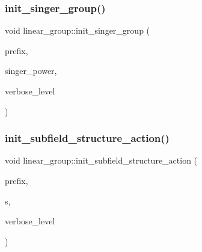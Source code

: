 \mbox{\label{classlinear__group_a6725d2f004cc13eadaa39dc29b26faae}} 
\subsubsection{\texorpdfstring{init\+\_\+singer\+\_\+group()}{init\_singer\_group()}}
{\footnotesize\ttfamily void linear\+\_\+group\+::init\+\_\+singer\+\_\+group (\begin{DoxyParamCaption}\item[{\mbox{\hyperlink{galois_8h_ab6cc7b4aeb6ea31aba2b3fbfc83ff5e6}{B\+Y\+TE}} $\ast$}]{prefix,  }\item[{\mbox{\hyperlink{galois_8h_a09fddde158a3a20bd2dcadb609de11dc}{I\+NT}}}]{singer\+\_\+power,  }\item[{\mbox{\hyperlink{galois_8h_a09fddde158a3a20bd2dcadb609de11dc}{I\+NT}}}]{verbose\+\_\+level }\end{DoxyParamCaption})}

\mbox{\label{classlinear__group_a0c97a4ac9754a69abdde052bd3298804}} 
\subsubsection{\texorpdfstring{init\+\_\+subfield\+\_\+structure\+\_\+action()}{init\_subfield\_structure\_action()}}
{\footnotesize\ttfamily void linear\+\_\+group\+::init\+\_\+subfield\+\_\+structure\+\_\+action (\begin{DoxyParamCaption}\item[{\mbox{\hyperlink{galois_8h_ab6cc7b4aeb6ea31aba2b3fbfc83ff5e6}{B\+Y\+TE}} $\ast$}]{prefix,  }\item[{\mbox{\hyperlink{galois_8h_a09fddde158a3a20bd2dcadb609de11dc}{I\+NT}}}]{s,  }\item[{\mbox{\hyperlink{galois_8h_a09fddde158a3a20bd2dcadb609de11dc}{I\+NT}}}]{verbose\+\_\+level }\end{DoxyParamCaption})}

